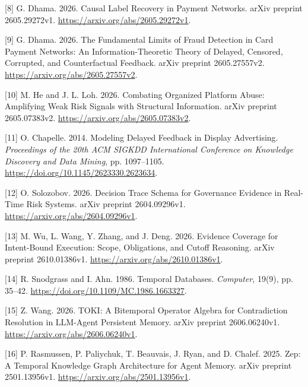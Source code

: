 \documentclass[
  11pt,
]{article}
\newlength{\cslhangindent}
\newlength{\cslentryspacingunit} %
\newenvironment{CSLReferences}[2] %
 {%
  \setlength{\parindent}{0pt}
  \ifodd #1
  \let\oldpar\par
  \def\par{\hangindent=\cslhangindent\oldpar}
  \fi
  \setlength{\parskip}{#2\cslentryspacingunit}
 }%
 {}
\begin{document}
\begin{CSLReferences}{1}{1}
\leavevmode{}%
{[}8{]} G. Dhama. 2026. Causal Label Recovery in Payment Networks. arXiv
preprint 2605.29272v1. \url{https://arxiv.org/abs/2605.29272v1}.

\leavevmode{}%
{[}9{]} G. Dhama. 2026. The Fundamental Limits of Fraud Detection in
Card Payment Networks: An Information-Theoretic Theory of Delayed,
Censored, Corrupted, and Counterfactual Feedback. arXiv preprint
2605.27557v2. \url{https://arxiv.org/abs/2605.27557v2}.

\leavevmode{}%
{[}10{]} M. He and J. L. Loh. 2026. Combating Organized Platform Abuse:
Amplifying Weak Risk Signals with Structural Information. arXiv preprint
2605.07383v2. \url{https://arxiv.org/abs/2605.07383v2}.

\leavevmode{}%
{[}11{]} O. Chapelle. 2014. Modeling Delayed Feedback in Display
Advertising. \emph{Proceedings of the 20th ACM SIGKDD International
Conference on Knowledge Discovery and Data Mining}, pp. 1097--1105.
\url{https://doi.org/10.1145/2623330.2623634}.

\leavevmode{}%
{[}12{]} O. Solozobov. 2026. Decision Trace Schema for Governance
Evidence in Real-Time Risk Systems. arXiv preprint 2604.09296v1.
\url{https://arxiv.org/abs/2604.09296v1}.

\leavevmode{}%
{[}13{]} M. Wu, L. Wang, Y. Zhang, and J. Deng. 2026. Evidence Coverage
for Intent-Bound Execution: Scope, Obligations, and Cutoff Reasoning.
arXiv preprint 2610.01386v1. \url{https://arxiv.org/abs/2610.01386v1}.

\leavevmode{}%
{[}14{]} R. Snodgrass and I. Ahn. 1986. Temporal Databases.
\emph{Computer}, 19(9), pp. 35--42.
\url{https://doi.org/10.1109/MC.1986.1663327}.

\leavevmode{}%
{[}15{]} Z. Wang. 2026. TOKI: A Bitemporal Operator Algebra for
Contradiction Resolution in LLM-Agent Persistent Memory. arXiv preprint
2606.06240v1. \url{https://arxiv.org/abs/2606.06240v1}.

\leavevmode{}%
{[}16{]} P. Rasmussen, P. Paliychuk, T. Beauvais, J. Ryan, and D.
Chalef. 2025. Zep: A Temporal Knowledge Graph Architecture for Agent
Memory. arXiv preprint 2501.13956v1.
\url{https://arxiv.org/abs/2501.13956v1}.


\end{CSLReferences}
\end{document}

